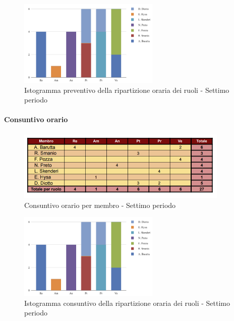\vspace{0.6cm}

\begin{figure}[H]
    \centering
    \includegraphics[width=0.6\textwidth]{../Images/graficoConsPrev7.png}
    \caption{Istogramma preventivo della ripartizione oraria dei ruoli - Settimo periodo}
    \label{fig:Preventivo_ripartizione_oraria_7}
\end{figure}

\pagebreak

\paragraph{Consuntivo orario}

\begin{figure}[H]
    \centering
    \includegraphics[width=0.9\textwidth]{../Images/tabCons7.png}
    \caption{Consuntivo orario per membro - Settimo periodo}
    \label{fig:Constuntivo_orario_7}
\end{figure}

\vspace{0.6cm}

\begin{figure}[H]
    \centering
    \includegraphics[width=0.6\textwidth]{../Images/graficoConsPrev7.png}
    \caption{Istogramma consuntivo della ripartizione oraria dei ruoli - Settimo periodo}
    \label{fig:Consuntivo_ripartizione_oraria_7}
\end{figure}
